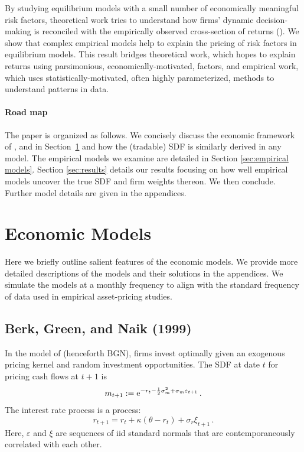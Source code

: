 \documentclass[12pt]{scrarticle}
\begin{document}
By studying equilibrium models with a small number of economically meaningful risk factors, theoretical work tries to understand how firms' dynamic decision-making is reconciled with the empirically observed cross-section of returns (\citet{bgn, GKZjpe03, CFG04, Zhang05, EP13, kp_2014, KuehnSchmid14, ACDL18, GS21}). We show that complex empirical models help to explain the pricing of risk factors in equilibrium models. This result bridges theoretical work, which hopes to explain returns using parsimonious, economically-motivated, factors, and empirical work, which uses statistically-motivated, often highly parameterized, methods to understand patterns in data. 

\paragraph{Road map} The paper is organized as follows. We concisely discuss the economic framework of \citet*{bgn}, \citet{kp_2014} and \citet{GS21} in Section~\ref{sec:economic models} and how the (tradable) SDF is similarly derived in any model. The empirical models we examine are detailed in Section \ref{sec:empirical models}. Section \ref{sec:results} details our results focusing on how well empirical models uncover the true SDF and firm weights thereon. We then conclude. Further model details are given in the appendices.

\section{Economic Models}\label{sec:economic models}

Here we briefly outline salient features of the economic models. We provide more detailed descriptions of the models and their solutions in the appendices. We simulate the models at a monthly frequency to align with the standard frequency of data used in empirical asset-pricing studies.

\subsection{Berk, Green, and Naik (1999)}

In the model of \citet*{bgn} (henceforth BGN), firms invest optimally given an exogenous pricing kernel and random investment opportunities.  The SDF at date $t$ for pricing cash flows at $t+1$ is 
\begin{equation}
m_{t+1} := \mathrm{e}^{-r_t - \frac{1}{2}\sigma_m^2 + \sigma_m \varepsilon_{t+1}}\,.
\end{equation}
The interest rate process is a \cite{vasicek} process:
\begin{equation}
r_{t+1} = r_t + \kappa(\theta - r_t) + \sigma_r \xi_{t+1}\,.
\end{equation}
Here, $\varepsilon$ and $\xi$ are sequences of iid standard normals that are contemporaneously correlated with each other.
\end{document}
